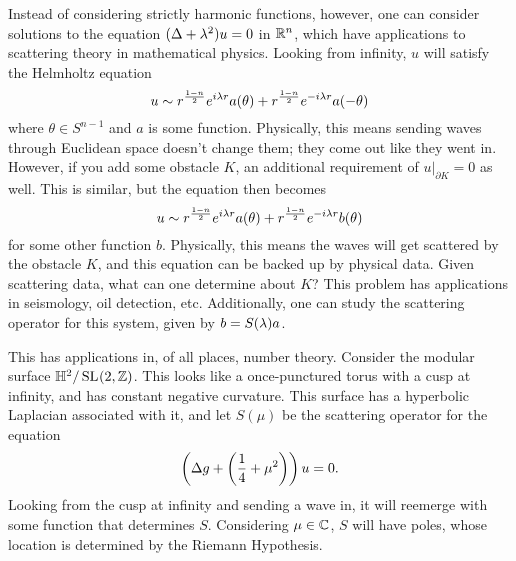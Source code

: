 Instead of considering strictly harmonic functions, however, one can consider solutions to the equation $(\Delta + \lambda^2)u = 0$ in $\mathbb{R}^n$, which have applications to scattering theory in mathematical physics. Looking from infinity, $u$ will satisfy the Helmholtz equation
\[
u \sim r^{\frac{1-n}{2}} e^{i\lambda r}a(\theta) +r^{\frac{1-n}{2}}e^{-i\lambda r}a(-\theta)
\]
where $\theta\in S^{n-1}$ and $a$ is some function. Physically, this means sending waves through Euclidean space doesn't change them; they come out like they went in. However, if you add some obstacle $K$, an additional requirement of $u|_{\partial K} = 0$ as well. This is similar, but the equation then becomes
\[
u \sim r^{\frac{1-n}{2}} e^{i\lambda r}a(\theta) +r^{\frac{1-n}{2}}e^{-i\lambda r}b(\theta)
\]
for some other function $b$. Physically, this means the waves will get scattered by the obstacle $K$, and this equation can be backed up by physical data. Given scattering data, what can one determine about $K$? This problem has applications in seismology, oil detection, etc. Additionally, one can study the scattering operator for this system, given by $b = S(\lambda) a$.

This has applications in, of all places, number theory. Consider the modular surface $\mathbb{H}^2/\operatorname{SL}_{}(2,\mathbb{Z})$. This looks like a once-punctured torus with a cusp at infinity, and has constant negative curvature. This surface has a hyperbolic Laplacian associated with it, and let $S(\mu)$ be the scattering operator for the equation
\[\left(\Delta g +\left(\frac{1}{4} +\mu^2\right)\right)u = 0.\]
Looking from the cusp at infinity and sending a wave in, it will reemerge with some function that determines $S$. Considering $\mu\in\mathbb{C}$, $S$ will have poles, whose location is determined by the Riemann Hypothesis.
